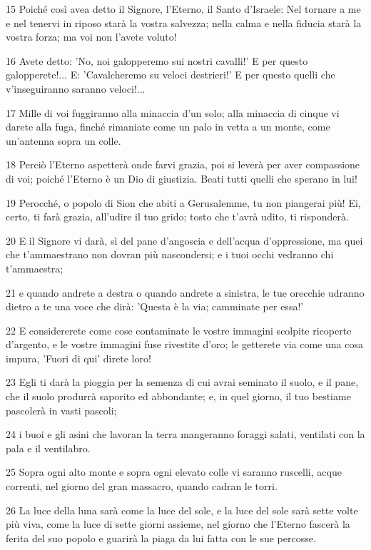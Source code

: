 \par 15 Poiché così avea detto il Signore, l'Eterno, il Santo d'Israele: Nel tornare a me e nel tenervi in riposo starà la vostra salvezza; nella calma e nella fiducia starà la vostra forza; ma voi non l'avete voluto!
\par 16 Avete detto: 'No, noi galopperemo sui nostri cavalli!' E per questo galopperete!... E: 'Cavalcheremo su veloci destrieri!' E per questo quelli che v'inseguiranno saranno veloci!...
\par 17 Mille di voi fuggiranno alla minaccia d'un solo; alla minaccia di cinque vi darete alla fuga, finché rimaniate come un palo in vetta a un monte, come un'antenna sopra un colle.
\par 18 Perciò l'Eterno aspetterà onde farvi grazia, poi si leverà per aver compassione di voi; poiché l'Eterno è un Dio di giustizia. Beati tutti quelli che sperano in lui!
\par 19 Perocché, o popolo di Sion che abiti a Gerusalemme, tu non piangerai più! Ei, certo, ti farà grazia, all'udire il tuo grido; tosto che t'avrà udito, ti risponderà.
\par 20 E il Signore vi darà, sì del pane d'angoscia e dell'acqua d'oppressione, ma quei che t'ammaestrano non dovran più nascondersi; e i tuoi occhi vedranno chi t'ammaestra;
\par 21 e quando andrete a destra o quando andrete a sinistra, le tue orecchie udranno dietro a te una voce che dirà: 'Questa è la via; camminate per essa!'
\par 22 E considererete come cose contaminate le vostre immagini scolpite ricoperte d'argento, e le vostre immagini fuse rivestite d'oro; le getterete via come una cosa impura, 'Fuori di qui' direte loro!
\par 23 Egli ti darà la pioggia per la semenza di cui avrai seminato il suolo, e il pane, che il suolo produrrà saporito ed abbondante; e, in quel giorno, il tuo bestiame pascolerà in vasti pascoli;
\par 24 i buoi e gli asini che lavoran la terra mangeranno foraggi salati, ventilati con la pala e il ventilabro.
\par 25 Sopra ogni alto monte e sopra ogni elevato colle vi saranno ruscelli, acque correnti, nel giorno del gran massacro, quando cadran le torri.
\par 26 La luce della luna sarà come la luce del sole, e la luce del sole sarà sette volte più viva, come la luce di sette giorni assieme, nel giorno che l'Eterno fascerà la ferita del suo popolo e guarirà la piaga da lui fatta con le sue percosse.
